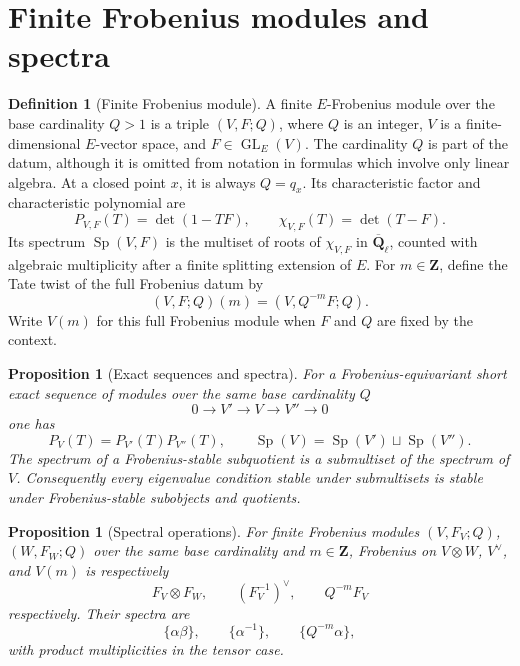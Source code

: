 \documentclass[10pt]{article}
\newtheorem{proposition}[theorem]{Proposition}
\theoremstyle{definition}
\newtheorem{definition}[theorem]{Definition}
\newcommand{\Qlb}{\overline{\mathbf Q}_\ell}
\begin{document}
\section{Finite Frobenius modules and spectra}

\begin{definition}[Finite Frobenius module]
A finite \(E\)-Frobenius module over the base cardinality \(Q>1\) is a
triple \((V,F;Q)\), where \(Q\) is an integer, \(V\) is a finite-dimensional
\(E\)-vector space, and \(F\in\operatorname{GL}_E(V)\).  The cardinality
\(Q\) is part of the datum, although it is omitted from notation in formulas
which involve only linear algebra.  At a closed point \(x\), it is always
\(Q=q_x\).
Its characteristic factor and characteristic polynomial are
\[
 P_{V,F}(T)=\det(1-TF),
 \qquad
 \chi_{V,F}(T)=\det(T-F).
\]
Its spectrum \(\operatorname{Sp}(V,F)\) is the multiset of roots of
\(\chi_{V,F}\) in \(\Qlb\), counted with algebraic multiplicity after a
finite splitting extension of \(E\).
For \(m\in\mathbf Z\), define the Tate twist of the full Frobenius datum by
\[
                   (V,F;Q)(m)=(V,Q^{-m}F;Q).
\]
Write \(V(m)\) for this full Frobenius module when \(F\) and \(Q\) are
fixed by the context.
\end{definition}

\begin{proposition}[Exact sequences and spectra]
For a Frobenius-equivariant short exact sequence of modules over the same
base cardinality \(Q\)
\[
             0\longrightarrow V'\longrightarrow V\longrightarrow V''
             \longrightarrow0
\]
one has
\[
 P_V(T)=P_{V'}(T)P_{V''}(T),\qquad
 \operatorname{Sp}(V)=\operatorname{Sp}(V')\sqcup
                       \operatorname{Sp}(V'').
\]
The spectrum of a Frobenius-stable subquotient is a submultiset of the
spectrum of \(V\).  Consequently every eigenvalue condition stable under
submultisets is stable under Frobenius-stable subobjects and quotients.
\end{proposition}

\begin{proposition}[Spectral operations]
For finite Frobenius modules \((V,F_V;Q)\), \((W,F_W;Q)\) over the same
base cardinality and \(m\in\mathbf Z\), Frobenius on
\(V\otimes W\), \(V^\vee\), and \(V(m)\) is respectively
\[
 F_V\otimes F_W,\qquad (F_V^{-1})^\vee,\qquad Q^{-m}F_V
\]
respectively.  Their spectra are
\[
 \{\alpha\beta\},\qquad\{\alpha^{-1}\},\qquad\{Q^{-m}\alpha\},
\]
with product multiplicities in the tensor case.
\end{proposition}
\end{document}
